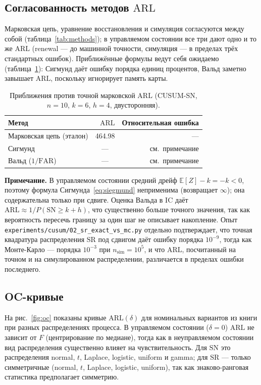 \documentclass[11pt,a4paper]{article}
\newcommand{\SN}{\mathrm{SN}}
\newcommand{\SR}{\mathrm{SR}}
\newcommand{\ARL}{\mathrm{ARL}}
\newcommand{\FAR}{\mathrm{FAR}}
\newcommand{\E}{\mathbb{E}}
\begin{document}
\subsection{Согласованность методов $\ARL$}
\label{sec:exp-methods}

Марковская цепь, уравнение восстановления и симуляция согласуются между
собой (таблица~\ref{tab:methods}); в управляемом состоянии все три дают
одно и то же $\ARL$ (renewal --- до машинной точности, симуляция --- в
пределах трёх стандартных ошибок). Приближённые формулы ведут себя
ожидаемо (таблица~\ref{tab:approx}): Сигмунд даёт ошибку порядка единиц
процентов, Вальд заметно завышает $\ARL$, поскольку игнорирует память
карты.

\begin{table}[htbp]\centering
\caption{Приближения против точной марковской $\ARL$ (CUSUM-SN,
$n=10$, $k=6$, $h=4$, двусторонняя).}
\label{tab:approx}
\small
\begin{tabular}{@{}l r r@{}}
\toprule
Метод & $\ARL$ & Относительная ошибка \\
\midrule
Марковская цепь (эталон) & 464.98 & --- \\
Сигмунд & \multicolumn{1}{c}{---} & см.\ примечание \\
Вальд ($1/\FAR$) & \multicolumn{1}{c}{---} & см.\ примечание \\
\bottomrule
\end{tabular}
\normalsize
\end{table}

\noindent
\textbf{Примечание.} В управляемом состоянии средний дрейф
$\E[Z]-k = -k < 0$, поэтому формула Сигмунда~\eqref{eq:siegmund}
неприменима (возвращает $\infty$); она содержательна только при сдвиге.
Оценка Вальда в IC даёт $\ARL\approx 1/P(\SN\ge k+h)$, что существенно
больше точного значения, так как вероятность пересечь границу за один шаг
не описывает накопление. Опыт \texttt{experiments/cusum/02\_sr\_exact\_vs\_mc.py}
отдельно подтверждает, что точная квадратура распределения $\SR$ под
сдвигом даёт ошибку порядка $10^{-9}$, тогда как Монте-Карло --- порядка
$10^{-3}$ при $n_{\text{sim}}=10^5$, и что $\ARL$, посчитанный на точном
и на симулированном распределении, различается в пределах ошибки
последнего.

\subsection{OC-кривые}
\label{sec:exp-oc}

На рис.~\ref{fig:oc} показаны кривые $\ARL(\delta)$ для номинальных
вариантов из книги при разных распределениях процесса. В управляемом
состоянии ($\delta=0$) $\ARL$ не зависит от $F$ (центрирование по
медиане), тогда как в неуправляемом состоянии вид распределения
существенно влияет на чувствительность. Для $\SN$ это распределения
normal, $t$, Laplace, logistic, uniform и gamma; для $\SR$ --- только
симметричные (normal, $t$, Laplace, logistic, uniform), так как
знаково-ранговая статистика предполагает симметрию.
\end{document}
